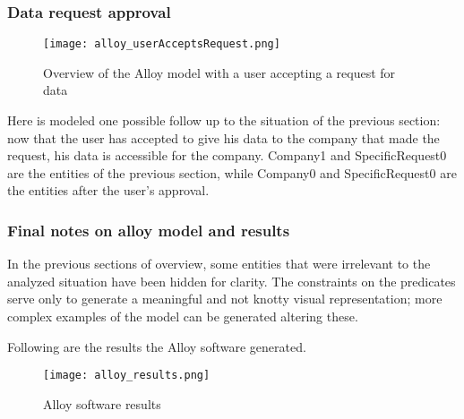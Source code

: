 \documentclass[../main.tex]{subfiles}
\begin{document}
\subsubsection{Data request approval}

\begin{figure}[h!]
	\texttt{[image: alloy\_userAcceptsRequest.png]}
	\caption{Overview of the Alloy model with a user accepting a request for data}
	\label{fig:alloy_userAcceptsRequest}
\end{figure}

Here is modeled one possible follow up to the situation of the previous section: now that the user has accepted to give his data to the company that made the request, his data is accessible for the company. Company1 and SpecificRequest0 are the entities of the previous section, while Company0 and SpecificRequest0 are the entities after the user's approval.
\newpage

\subsubsection{Final notes on alloy model and results}

In the previous sections of overview, some entities that were irrelevant to the analyzed situation have been hidden for clarity. The constraints on the predicates serve only to generate a meaningful and not knotty visual representation; more complex examples of the model can be generated altering these.

Following are the results the Alloy software generated.

\begin{figure}[h!]
	\centering
	\texttt{[image: alloy\_results.png]}
	\caption{Alloy software results}
	\label{fig:alloy_results}
\end{figure}
\end{document}
